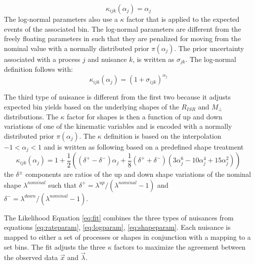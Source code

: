 \begin{equation}
\label{eq:rateparam}
\kappa_{ijk}(\alpha_j) = \alpha_j
\end{equation}  
The log-normal parameters also use a $\kappa$ factor that is applied to the expected events of the associated bin. The log-normal parameters are different from the freely floating parameters in such that they are penalized for moving from the nominal value with a normally distributed prior $\pi(\alpha_j)$. The prior uncertainty associated with a process $j$ and nuisance $k$, is written as $\sigma_{jk}$. The log-normal definition follows with:
\begin{equation}
\label{eq:logparam}
\kappa_{ijk}(\alpha_j) = (1+\sigma_{ijk})^{\alpha_j}
\end{equation}

The third type of nuisance is different from the first two because it adjusts expected bin yields based on the underlying shapes of the $R_{ISR}$ and $M_\perp$ distributions. The $\kappa$ factor for shapes is then a function of up and down variations of one of the kinematic variables and is encoded with a normally distributed prior $\pi(\alpha_j)$. The $\kappa$ definition is based on the interpolation $-1<\alpha_j<1$ and is written as following based on a predefined shape treatment \cite{Conway:2011in}
\begin{equation}
\label{eq:shapeparam}
\kappa_{ijk}(\alpha_j)= 1 + \frac{1}{2}((\delta^+ - \delta^-)\alpha_j + \frac{1}{8}(\delta^+ + \delta^-)(3\alpha_j^6-10\alpha_j^4+15\alpha_j^2))
\end{equation}
the $\delta^\pm$ components are ratios of the up and down shape variations of the nominal shape $\lambda^{nominal}$ such that $\delta^+ = \lambda^{up}/(\lambda^{nominal}-1)$ and $\delta^- = \lambda^{down}/(\lambda^{nominal}-1).$

The Likelihood Equation \ref{eq:fit} combines the three types of nuisances from equations \ref{eq:rateparam}, \ref{eq:logparam}, \ref{eq:shapeparam}. Each nuisance is mapped to either a set of processes or shapes in conjunction with a mapping to a set bins. The fit adjusts the three $\kappa$ factors to maximize the agreement between the observed data $\vec{x}$ and $\vec{\lambda}$. 


